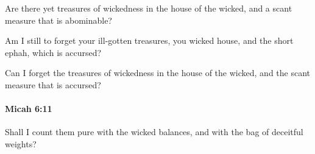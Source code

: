 			\begin{versebox}
					\item[BHS] 
					\item[LXX] 
					\item[ASV] Are there yet treasures of wickedness in the house of the wicked, and a scant measure that is abominable?
					\item[NIV] Am I still to forget your ill-gotten treasures, you wicked house, and the short ephah, which is accursed?
					\item[NRSV] Can I forget the treasures of wickedness in the house of the wicked, and the scant measure that is accursed?
			\end{versebox}

		\paragraph{Micah 6:11} %
			\label{MICAH-6-11}

			Shall I count them pure with the wicked balances, and with the bag of deceitful weights?

